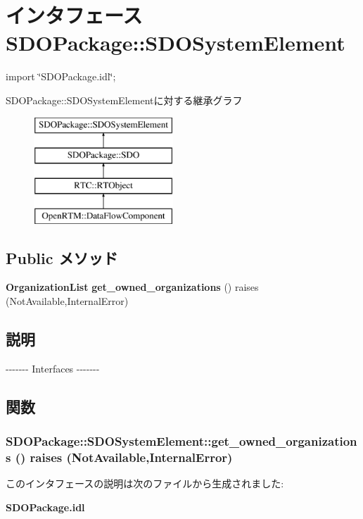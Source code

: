 \section{インタフェース SDOPackage::SDOSystemElement}
\label{interfaceSDOPackage_1_1SDOSystemElement}


{\ttfamily import \char`\"{}SDOPackage.idl\char`\"{};}

SDOPackage::SDOSystemElementに対する継承グラフ\begin{figure}[H]
\begin{center}
\leavevmode
\includegraphics[height=4cm]{interfaceSDOPackage_1_1SDOSystemElement}
\end{center}
\end{figure}
\subsection*{Public メソッド}
\begin{DoxyCompactItemize}
\item 
{\bf OrganizationList} {\bf get\_\-owned\_\-organizations} ()  raises (NotAvailable,InternalError)
\end{DoxyCompactItemize}


\subsection{説明}
-\/-\/-\/-\/-\/-\/-\/ Interfaces -\/-\/-\/-\/-\/-\/-\/ 

\subsection{関数}
\subsubsection[{get\_\-owned\_\-organizations}]{ SDOPackage::SDOSystemElement::get\_\-owned\_\-organizations ()  raises (NotAvailable,InternalError)}\label{interfaceSDOPackage_1_1SDOSystemElement_a81238047c5dfa47d2cf3ebce1b78b240}


このインタフェースの説明は次のファイルから生成されました:\begin{DoxyCompactItemize}
\item 
{\bf SDOPackage.idl}\end{DoxyCompactItemize}
